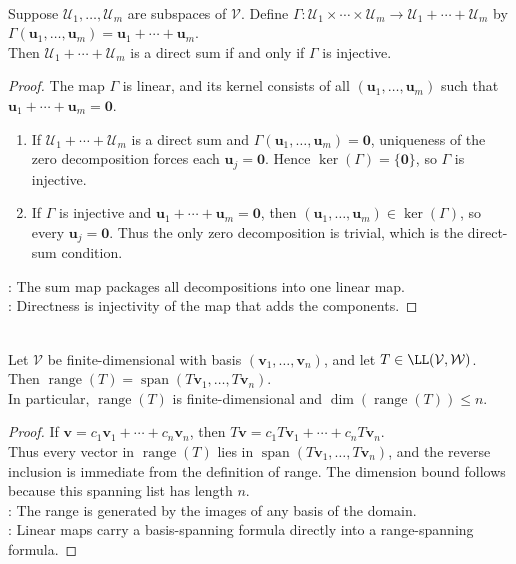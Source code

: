\begin{proposition} \label{prop:direct-sum-map-injective} \\
Suppose $\mathcal{U}_1,\ldots,\mathcal{U}_m$ are subspaces of $\mathcal{V}$. Define $\Gamma:\mathcal{U}_1\times\cdots\times\mathcal{U}_m\to\mathcal{U}_1+\cdots+\mathcal{U}_m$ by $\Gamma(\mathbf{u}_1,\ldots,\mathbf{u}_m)=\mathbf{u}_1+\cdots+\mathbf{u}_m$.\\
Then $\mathcal{U}_1+\cdots+\mathcal{U}_m$ is a direct sum if and only if $\Gamma$ is injective.
\begin{proof}
The map $\Gamma$ is linear, and its kernel consists of all $(\mathbf{u}_1,\ldots,\mathbf{u}_m)$ such that $\mathbf{u}_1+\cdots+\mathbf{u}_m=\mathbf{0}$.
\begin{enumerate}[label=\roman*.]
\setlength{\itemsep}{0pt}
\item[$(\Rightarrow)$] If $\mathcal{U}_1+\cdots+\mathcal{U}_m$ is a direct sum and $\Gamma(\mathbf{u}_1,\ldots,\mathbf{u}_m)=\mathbf{0}$, uniqueness of the zero decomposition forces each $\mathbf{u}_j=\mathbf{0}$. Hence $\ker(\Gamma)=\{\mathbf{0}\}$, so $\Gamma$ is injective.
\item[$(\Leftarrow)$] If $\Gamma$ is injective and $\mathbf{u}_1+\cdots+\mathbf{u}_m=\mathbf{0}$, then $(\mathbf{u}_1,\ldots,\mathbf{u}_m)\in\ker(\Gamma)$, so every $\mathbf{u}_j=\mathbf{0}$. Thus the only zero decomposition is trivial, which is the direct-sum condition.
\end{enumerate}
: The sum map packages all decompositions into one linear map.\\
: Directness is injectivity of the map that adds the components.
\end{proof}
\end{proposition}

\begin{theorem} \label{thm:range-spanned-by-images-of-basis} \\
Let $\mathcal{V}$ be finite-dimensional with basis $(\mathbf{v}_1,\ldots,\mathbf{v}_n)$, and let $T\in\LL(\mathcal{V},\mathcal{W})$. Then $\operatorname{range}(T)=\operatorname{span}(T\mathbf{v}_1,\ldots,T\mathbf{v}_n)$.\\
In particular, $\operatorname{range}(T)$ is finite-dimensional and $\dim(\operatorname{range}(T))\leq n$.
\begin{proof}
If $\mathbf{v}=c_1\mathbf{v}_1+\cdots+c_n\mathbf{v}_n$, then $T\mathbf{v}=c_1T\mathbf{v}_1+\cdots+c_nT\mathbf{v}_n$.\\
Thus every vector in $\operatorname{range}(T)$ lies in $\operatorname{span}(T\mathbf{v}_1,\ldots,T\mathbf{v}_n)$, and the reverse inclusion is immediate from the definition of range. The dimension bound follows because this spanning list has length $n$.\\
: The range is generated by the images of any basis of the domain.\\
: Linear maps carry a basis-spanning formula directly into a range-spanning formula.
\end{proof}
\end{theorem}

